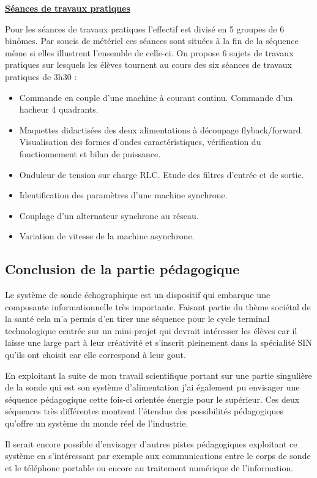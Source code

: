 \documentclass[12pt]{article}
\begin{document}
\vspace{10pt}




\newpage
\color{red}
\textbf{\underline{Séances de travaux pratiques}}\par
\color{black}
\vspace{10pt}
Pour les séances de travaux pratiques l'effectif est divisé en 5 groupes de 6 binômes. Par soucis de métériel ces séances sont situées à la fin de la séquence même si elles illustrent l'ensemble de celle-ci. On propose 6 sujets de travaux pratiques sur lesquels les élèves tournent au cours des six séances de travaux pratiques de 3h30 : \par
\vspace{10pt}
\begin{itemize}
\item Commande en couple d'une machine à courant continu. Commande d'un hacheur 4 quadrants.
\item Maquettes didactisées des deux alimentations à découpage flyback/forward. Visualisation des formes d'ondes caractéristiques, vérification du fonctionnement et bilan de puissance.
\item Onduleur de tension sur charge RLC. Etude des filtres d'entrée et de sortie.
\item Identification des paramètres d'une machine synchrone.
\item Couplage d'un alternateur synchrone au réseau.
\item Variation de vitesse de la machine asynchrone.
\end{itemize}


\color{black}
\subsection{Conclusion de la partie pédagogique}

Le système de sonde échographique est un dispositif qui embarque une composante informationnelle très importante. Faisant partie du thème sociétal de la santé cela m'a permis d'en tirer une séquence pour le cycle terminal technologique centrée sur un mini-projet qui devrait intéresser les élèves car il laisse une large part à leur créativité et s'inscrit pleinement dans la spécialité SIN qu'ils ont choisit car elle correspond à leur gout.\par
En exploitant la suite de mon travail scientifique portant sur une partie singulière de la sonde qui est son système d'alimentation j'ai également pu envisager une séquence pédagogique cette fois-ci orientée énergie pour le supérieur. Ces deux séquences très différentes montrent l'étendue des possibilités pédagogiques qu'offre un système du monde réel de l'industrie.\par
Il serait encore possible d'envisager d'autres pistes pédagogiques exploitant ce système en s'intéressant par exemple aux communications entre le corps de sonde et le téléphone portable ou encore au traitement numérique de l'information.
\end{document}
